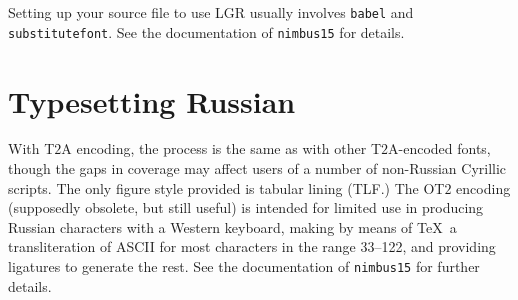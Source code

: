 \documentclass[11pt]{article}
\begin{document}
Setting up your source file to use LGR usually involves {\tt babel} and {\tt substitutefont}. See the documentation of {\tt nimbus15} for details.
\newpage
 \section*{Typesetting Russian}
With T$2$A encoding, the process is the same as with other T$2$A-encoded fonts, though the gaps in coverage may affect users of a number of non-Russian Cyrillic scripts. The only figure style provided is tabular lining (TLF.)
\newpage
The OT$2$ encoding (supposedly obsolete, but still useful) is intended for limited use in producing Russian characters with a Western keyboard, making by means of \TeX\ a transliteration of ASCII for most characters in the range 33--122, and providing ligatures to generate the rest. See the documentation of {\tt nimbus15} for further details.
\end{document}
